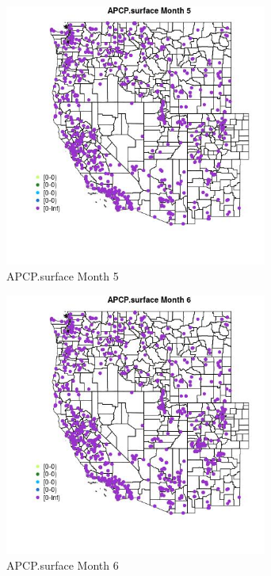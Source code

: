 \begin{figure} 
\centering  
\includegraphics[width=0.77\textwidth]{Code_Outputs/Report_ML_input_PM25_Step4_part_f_de_duplicated_aveswNAs_MapObsMo5APCPsurface.jpg} 
\caption{\label{fig:Report_ML_input_PM25_Step4_part_f_de_duplicated_aveswNAsMapObsMo5APCPsurface}APCP.surface Month 5} 
\end{figure} 
 

\begin{figure} 
\centering  
\includegraphics[width=0.77\textwidth]{Code_Outputs/Report_ML_input_PM25_Step4_part_f_de_duplicated_aveswNAs_MapObsMo6APCPsurface.jpg} 
\caption{\label{fig:Report_ML_input_PM25_Step4_part_f_de_duplicated_aveswNAsMapObsMo6APCPsurface}APCP.surface Month 6} 
\end{figure} 
 

